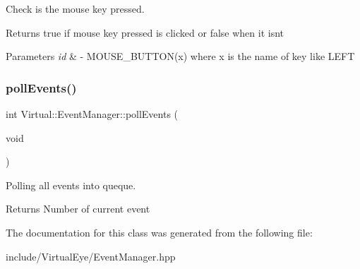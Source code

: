 Check is the mouse key pressed. 

\begin{DoxyReturn}{Returns}
true if mouse key pressed is clicked or false when it isn\textquotesingle{}t
\end{DoxyReturn}

\begin{DoxyParams}{Parameters}
{\em id} & -\/ M\+O\+U\+S\+E\+\_\+\+B\+U\+T\+T\+O\+N(x) where x is the name of key like L\+E\+FT \\
\hline
\end{DoxyParams}
\hypertarget{class_virtual_1_1_event_manager_a2e2394e7bb1ca6c7f2fc45813183d17a}{}\label{class_virtual_1_1_event_manager_a2e2394e7bb1ca6c7f2fc45813183d17a} 
\subsubsection{\texorpdfstring{poll\+Events()}{pollEvents()}}
{\footnotesize\ttfamily int Virtual\+::\+Event\+Manager\+::poll\+Events (\begin{DoxyParamCaption}\item[{void}]{ }\end{DoxyParamCaption})}



Polling all events into queque. 

\begin{DoxyReturn}{Returns}
Number of current event 
\end{DoxyReturn}


The documentation for this class was generated from the following file\+:\begin{DoxyCompactItemize}
\item 
include/\+Virtual\+Eye/Event\+Manager.\+hpp\end{DoxyCompactItemize}
